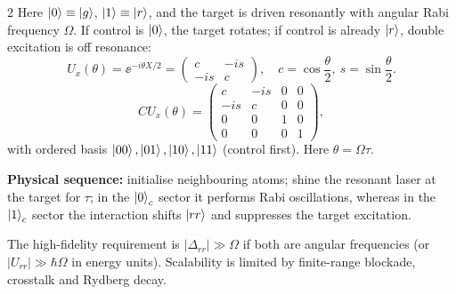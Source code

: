 \begin{multicols}{2}\small
{}
Here $\left\lvert 0\right\rangle\equiv\left\lvert g\right\rangle$, $\left\lvert 1\right\rangle\equiv\left\lvert r\right\rangle$, and the target is driven resonantly with angular Rabi frequency $\Omega$. If control is $\left\lvert 0\right\rangle$, the target rotates; if control is already $\left\lvert r\right\rangle$, double excitation is off resonance:
\[U_x(\theta)=\ee^{-i\theta X/2}
=\begin{pmatrix}c&-is\\-is&c\end{pmatrix},\quad c=\cos\frac\theta2,\ s=\sin\frac\theta2.\]
\[\boxed{CU_x(\theta)=\begin{pmatrix}
 c&-is&0&0\\-is&c&0&0\\0&0&1&0\\0&0&0&1
\end{pmatrix}},\]
with ordered basis $\left\lvert 00\right\rangle,\left\lvert 01\right\rangle,\left\lvert 10\right\rangle,\left\lvert 11\right\rangle$ (control first). Here $\theta=\Omega\tau$.

\textbf{Physical sequence:} initialise neighbouring atoms; shine the resonant laser at the target for $\tau$; in the $\left\lvert 0\right\rangle_c$ sector it performs Rabi oscillations, whereas in the $\left\lvert 1\right\rangle_c$ sector the interaction shifts $\left\lvert rr\right\rangle$ and suppresses the target excitation.

\begin{center}
\end{center}
The high-fidelity requirement is $|\Delta_{rr}|\gg\Omega$ if both are angular frequencies (or $|U_{rr}|\gg\hbar\Omega$ in energy units). Scalability is limited by finite-range blockade, crosstalk and Rydberg decay.


\end{multicols}
